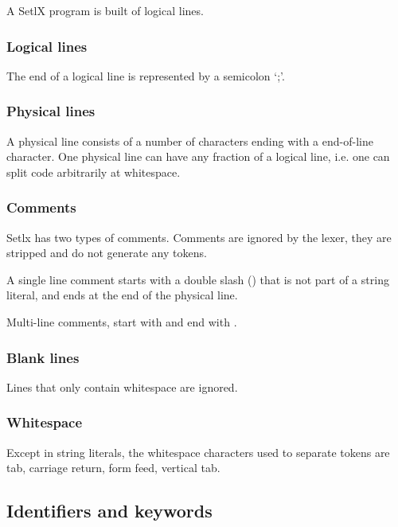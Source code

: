 A SetlX program is built of logical lines.

%
\subsubsection{Logical lines}

The end of a logical line is represented by a semicolon `;'.

%
\subsubsection{Physical lines}

A physical line consists of a number of characters ending with a end-of-line character. One physical line can have any fraction of a logical line, i.e. one can split code arbitrarily at whitespace.

%
\subsubsection{Comments}

Setlx has two types of comments. Comments are ignored by the lexer, they are stripped and do not generate any tokens.


A single line comment starts with a double slash (\token{//}) that is not part of a string literal, and ends at the end of the physical line. 


Multi-line comments, start with \token{/*} and end with \token{*/}.

%
\subsubsection{Blank lines}

Lines that only contain whitespace are ignored.

%
\subsubsection{Whitespace}
Except in string literals, the whitespace characters used to separate tokens are tab, carriage return, form feed, vertical tab.

%
%
\subsection{Identifiers and keywords}

